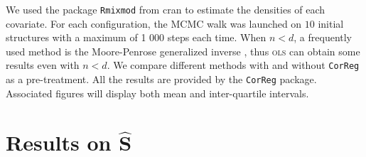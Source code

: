 \documentclass[12pt,a4paper]{report}
\begin{document}
	We used the package { \tt Rmixmod} from {\sc cran} \cite{packageRmixmod} to estimate the densities of each covariate. For each configuration, the MCMC walk was launched on $10$ initial structures with a maximum of 1 000 steps each time.
	When $n<d$, a frequently used method is the Moore-Penrose generalized inverse \cite{katsikis2008fast}, thus \textsc{ols} can obtain some results even with $n<d$. %
	We compare different methods with and without {\tt CorReg} as a pre-treatment. All the results are provided by the {\tt CorReg} package. Associated figures will display both mean and inter-quartile intervals.
	
		\section{Results on $\hat{\boldsymbol{S}}$}	\label{compZ}
\end{document}
